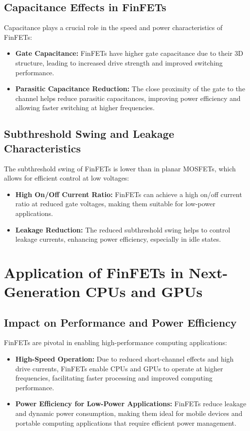 \documentclass[12pt]{report}
\begin{document}
\begin{titlepage}
\subsection{Capacitance Effects in FinFETs}
Capacitance plays a crucial role in the speed and power characteristics of FinFETs:
\begin{itemize}
    \item \textbf{Gate Capacitance:} FinFETs have higher gate capacitance due to their 3D structure, leading to increased drive strength and improved switching performance.
    \item \textbf{Parasitic Capacitance Reduction:} The close proximity of the gate to the channel helps reduce parasitic capacitances, improving power efficiency and allowing faster switching at higher frequencies.
\end{itemize}

\subsection{Subthreshold Swing and Leakage Characteristics}
The subthreshold swing of FinFETs is lower than in planar MOSFETs, which allows for efficient control at low voltages:
\begin{itemize}
    \item \textbf{High On/Off Current Ratio:} FinFETs can achieve a high on/off current ratio at reduced gate voltages, making them suitable for low-power applications.
    \item \textbf{Leakage Reduction:} The reduced subthreshold swing helps to control leakage currents, enhancing power efficiency, especially in idle states.
\end{itemize}

\section{Application of FinFETs in Next-Generation CPUs and GPUs}
\subsection{Impact on Performance and Power Efficiency}
FinFETs are pivotal in enabling high-performance computing applications:
\begin{itemize}
    \item \textbf{High-Speed Operation:} Due to reduced short-channel effects and high drive currents, FinFETs enable CPUs and GPUs to operate at higher frequencies, facilitating faster processing and improved computing performance.
    \item \textbf{Power Efficiency for Low-Power Applications:} FinFETs reduce leakage and dynamic power consumption, making them ideal for mobile devices and portable computing applications that require efficient power management.
\end{itemize}


\end{titlepage}
\end{document}
